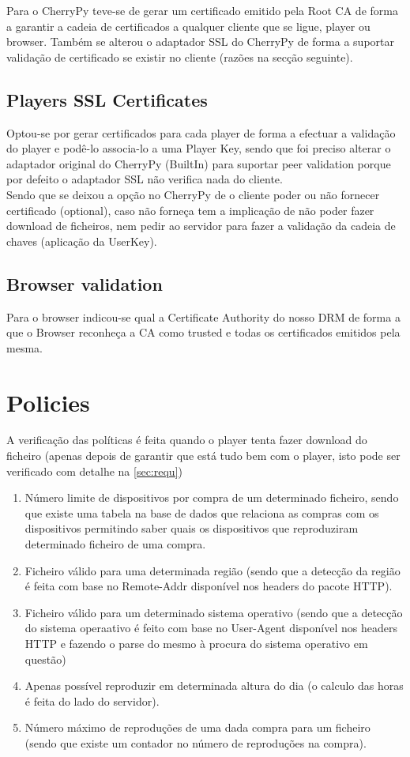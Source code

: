\documentclass[11pt,a4paper]{report}
\begin{document}
Para o CherryPy teve-se de gerar um certificado emitido pela Root CA de forma a garantir a cadeia de certificados a qualquer cliente que se ligue, player ou browser. Também se alterou o adaptador SSL do CherryPy de forma a suportar validação de certificado se existir no cliente (razões na secção seguinte).

\section{Players SSL Certificates}

Optou-se por gerar certificados para cada player de forma a efectuar a validação do player e podê-lo associa-lo a uma Player Key, sendo que foi preciso alterar o adaptador original do CherryPy (BuiltIn) para suportar peer validation porque por defeito o adaptador SSL não verifica nada do cliente.\\

Sendo que se deixou a opção no CherryPy de o cliente poder ou não fornecer certificado (optional), caso não forneça tem a implicação de não poder fazer download de ficheiros, nem pedir ao servidor para fazer a validação da cadeia de chaves (aplicação da UserKey). 

\section{Browser validation}
Para o browser indicou-se qual a Certificate Authority do nosso DRM de forma a que o Browser reconheça a CA como trusted e todas os certificados emitidos pela mesma.

\chapter{Policies}
A verificação das políticas é feita quando o player tenta fazer download do ficheiro (apenas depois de garantir que está tudo bem com o player, isto pode ser verificado com detalhe na \autoref{sec:requ})
\begin{enumerate}
\item Número limite de dispositivos por compra de um determinado ficheiro, sendo que existe uma tabela na base de dados que relaciona as compras com os dispositivos permitindo saber quais os dispositivos que reproduziram determinado ficheiro de uma compra.
\item Ficheiro válido para uma determinada região (sendo que a detecção da região é feita com base no Remote-Addr disponível nos headers do pacote HTTP).
\item Ficheiro válido para um determinado sistema operativo (sendo que a detecção do sistema operaativo é feito com base no User-Agent disponível nos headers HTTP e fazendo o parse do mesmo à procura do sistema operativo em questão)
\item Apenas possível reproduzir em determinada altura do dia (o calculo das horas é feita do lado do servidor).
\item Número máximo de reproduções de uma dada compra para um ficheiro (sendo que existe um contador no número de reproduções na compra).
\end{enumerate}
\end{document}
